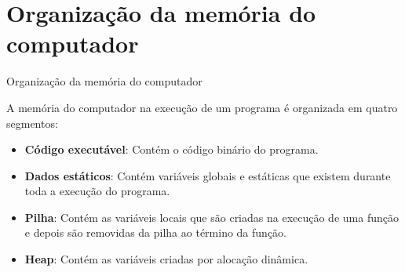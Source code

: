\documentclass[handout]{beamer}
\begin{document}
\section{Organização da memória do computador}

\begin{frame}[fragile]{Organização da memória do computador}

    A memória do computador na execução de um programa é organizada em quatro segmentos:
    \begin{itemize}
        \item {\bf Código executável}: Contém o código binário do programa.
        \item {\bf Dados estáticos}: Contém variáveis globais e estáticas que existem durante toda a execução do programa.
        \item {\bf Pilha}: Contém as variáveis locais que são criadas na execução de uma função e depois são removidas da pilha ao término da função.
        \item {\bf Heap}: Contém as variáveis criadas por alocação dinâmica.
    \end{itemize}

\end{frame}
\end{document}
